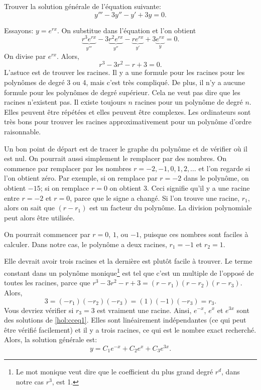 \begin{example}
	Trouver la solution générale de l'équation suivante:
	\begin{equation} \label{hol:cceq1}
		y''' - 3 y'' - y' + 3y = 0 .
	\end{equation}
	
	Essayons: $y = e^{rx}$. On substitue dans l'équation et l'on obtient\:
	\begin{equation*}
		\underbrace{r^3 e^{rx}}_{y'''} - 3 \underbrace{r^2 e^{rx}}_{y''} -
		\underbrace{r e^{rx}}_{y'} + 3 \underbrace{e^{rx}}_{y} = 0 .
	\end{equation*}
	On divise par $e^{rx}$.  Alors, 
	\begin{equation*}
		r^3 - 3 r^2 - r + 3 = 0 .
	\end{equation*}
	L'astuce est de trouver les racines. Il y a une formule pour les racines pour les polynômes de degré 3 ou 4, mais c'est très compliqué. De plus, il n'y a aucune formule pour les polynômes de degré supérieur. Cela ne veut pas dire que les racines n'existent pas. Il existe toujours 
	$n$ racines pour un polynôme de degré  $n$.  Elles peuvent être répétées 
	et elles peuvent être complexes. Les ordinateurs sont très bons pour trouver les racines approximativement pour un polynôme d'ordre  raisonnable.
	
	Un bon point de départ est de tracer le graphe du polynôme et de vérifier où il est nul.
	On pourrait aussi simplement le remplacer par des nombres. On commence par remplacer par les nombres  $r=-2,-1,0,1,2,\ldots$ et l'on regarde si l'on obtient zéro. Par exemple, si on remplace par $r=-2$ dans le polynôme, on obtient $-15$; si on remplace $r=0$ on obtient 3.
	Ceci signifie qu'il y a une racine entre $r=-2$ et $r=0$,
	parce que le signe a changé.
	Si l'on trouve une racine, $r_1$, alors on sait que $(r-r_1)$ est un facteur du polynôme. La division polynomiale peut alors être utilisée. 
	
	On pourrait commencer par $r=0$, $1$, ou $-1$, puisque ces nombres sont faciles à calculer. Dans notre cas, le polynôme a deux racines,  $r_1 = -1$
	et $r_2 = 1$.  
	
	Elle devrait avoir trois racines et la dernière est plutôt facile à trouver. Le terme constant dans un polynôme monique\footnote{Le mot monique veut dire que le coefficient du plus grand degré $r^d$, dans notre cas $r^3$, est 1.}
	est tel que c'est un multiple de l'opposé de toutes les racines, parce que 
	$r^3 - 3 r^2 - r + 3 = (r-r_1)(r-r_2)(r-r_3)$.
	Alors,
	\begin{equation*}
		3 = (-r_1)(-r_2)(-r_3) = (1)(-1)(-r_3) = r_3 .
	\end{equation*}
	Vous devriez vérifier si  $r_3 = 3$ est vraiment une racine.  
	Ainsi, $e^{-x}$, $e^{x}$
	et $e^{3x}$ sont des solutions de \eqref{hol:cceq1}.  
	Elles sont linéairement indépendantes (ce qui peut être vérifié facilement) et il y a trois racines, 
	ce qui est le nombre exact recherché. 
	Alors, la solution générale est: 
	\begin{equation*}
		y = C_1 e^{-x} + C_2 e^{x} + C_3 e^{3x} .
	\end{equation*}
	

\end{example}
